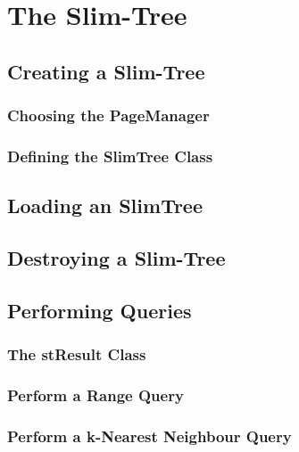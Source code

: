
\chapter{The Slim-Tree}

\section{Creating a Slim-Tree}

\subsection{Choosing the PageManager}

\subsection{Defining the SlimTree Class}

\section{Loading an SlimTree}

\section{Destroying a Slim-Tree}

\section{Performing Queries}

\subsection{The stResult Class}

\subsection{Perform a Range Query}

\subsection{Perform a k-Nearest Neighbour Query}

